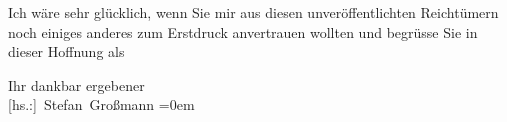 \pstart
           Ich wäre sehr glücklich, wenn Sie mir aus diesen unveröffentlichten Reichtümern noch
               einiges anderes zum Erstdruck anvertrauen wollten und begrüsse Sie in dieser Hoffnung
               als\pend
           
\pstart
           Ihr dankbar ergebener{\\[\baselineskip]}\spacefill\mbox{{[}hs.:{]} Stefan Großmann}\pend
           \leftskip=0em{}\endnumbering{}  
      